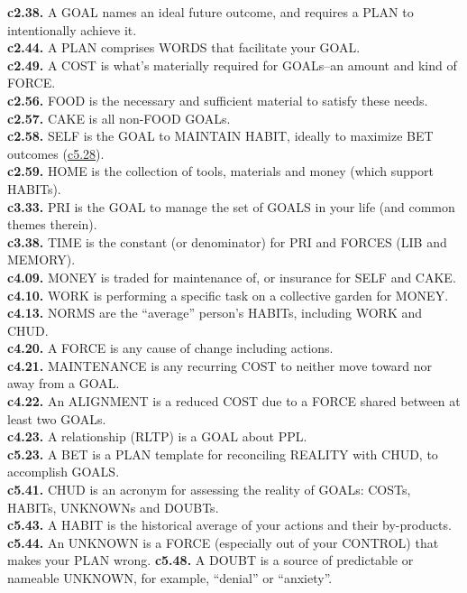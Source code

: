 \documentclass[
]{book}
\begin{document}
\textbf{c2.38.} A GOAL names an ideal future outcome, and requires a PLAN to intentionally achieve it.\\
\textbf{c2.44.} A PLAN comprises WORDS that facilitate your GOAL.\\
\textbf{c2.49.} A COST is what's materially required for GOALs--an amount and kind of FORCE.\\
\textbf{c2.56.} FOOD is the necessary and sufficient material to satisfy these needs.\\
\textbf{c2.57.} CAKE is all non-FOOD GOALs.\\
\textbf{c2.58.} SELF is the GOAL to MAINTAIN HABIT, ideally to maximize BET outcomes (\protect\hyperlink{bet}{c5.28}).\\
\textbf{c2.59.} HOME is the collection of tools, materials and money (which support HABITs).\\
\textbf{c3.33.} PRI is the GOAL to manage the set of GOALS in your life (and common themes therein).\\
\textbf{c3.38.} TIME is the constant (or denominator) for PRI and FORCES (LIB and MEMORY).\\
\textbf{c4.09.} MONEY is traded for maintenance of, or insurance for SELF and CAKE.\\
\textbf{c4.10.} WORK is performing a specific task on a collective garden for MONEY.\\
\textbf{c4.13.} NORMS are the ``average'' person's HABITs, including WORK and CHUD.\\
\textbf{c4.20.} A FORCE is any cause of change including actions.\\
\textbf{c4.21.} MAINTENANCE is any recurring COST to neither move toward nor away from a GOAL.\\
\textbf{c4.22.} An ALIGNMENT is a reduced COST due to a FORCE shared between at least two GOALs.\\
\textbf{c4.23.} A relationship (RLTP) is a GOAL about PPL.\\
\textbf{c5.23.} A BET is a PLAN template for reconciling REALITY with CHUD, to accomplish GOALS.\\
\textbf{c5.41.} CHUD is an acronym for assessing the reality of GOALs: COSTs, HABITs, UNKNOWNs and DOUBTs.\\
\textbf{c5.43.} A HABIT is the historical average of your actions and their by-products.
\textbf{c5.44.} An UNKNOWN is a FORCE (especially out of your CONTROL) that makes your PLAN wrong.
\textbf{c5.48.} A DOUBT is a source of predictable or nameable UNKNOWN, for example, ``denial'' or ``anxiety''.\\
\end{document}
